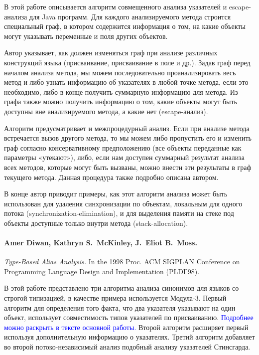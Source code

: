 \documentclass[12pt]{article}
\newcommand{\remark}[1]{\textcolor{blue}{#1}}
\newcommand{\eng}[1]{{\English#1}}
\begin{document}
      В этой работе описывается алгоритм совмещенного анализа указателей и
      escape-анализа для Java программ. Для каждого анализируемого
      метода строится специальный граф, в котором содержится информация о том,
      на какие объекты могут указывать переменные и поля других объектов.

      Автор указывает, как должен изменяться граф при анализе различных
      конструкций языка (присваивание, присваивание в поле и др.).
      Задав граф перед началом анализа метода, мы можем последовательно
      проанализировать весь метод и либо узнать информацию об указателях в
      любой точке метода, если это необходимо, либо в конце получить суммарную
      информацию для метода. Из графа также можно получить информацию о том,
      какие объекты могут быть доступны вне анализируемого метода, а какие нет
      (escape-анализ).

      Алгоритм предусматривает и межпроцедурный анализ. Если при анализе
      метода встречается вызов другого метода, то мы можем либо пропустить его
      и изменить граф согласно консервативному предположению (все объекты
      переданные как параметры «утекают»), либо, если нам доступен суммарный
      результат анализа всех методов, которые могут быть вызваны, можно внести
      эти результаты в граф текущего метода. Данная процедура также подробно
      описана автором.

      В конце автор приводит примеры, как этот алгоритм анализа может быть
      использован для удаления синхронизации по объектам, локальным для одного
      потока (\eng{synchronization-elimination}), и
      для выделения памяти на стеке под объекты доступные только внутри метода
      (\eng{stack-allocation}).

    \paragraph{Amer Diwan, Kathryn S.~McKinley, J.~Eliot B.~Moss.}
      \eng{
        \textit{Type-Based Alias Analysis.}
        In the 1998 Proc. ACM SIGPLAN Conference on Programming Language
        Design and Implementation (PLDI’98).
      }

      В этой работе представлено три алгоритма анализа синонимов для языков со
      строгой типизацией, в качестве примера используется Мо\-ду\-ла-3.
      Первый алгоритм для определения того факта, что два указателя указывают
      на один объект, использует совместимость типов указателей по
      присваиванию. \remark{Подробнее можно раскрыть в тексте основной
      работы.} Второй алгоритм расширяет первый используя дополнительную
      информацию о указателях. Третий алгоритм добавляет во второй
      потоко-независимый анализ подобный анализу указателей Стинсгарда.
\end{document}
